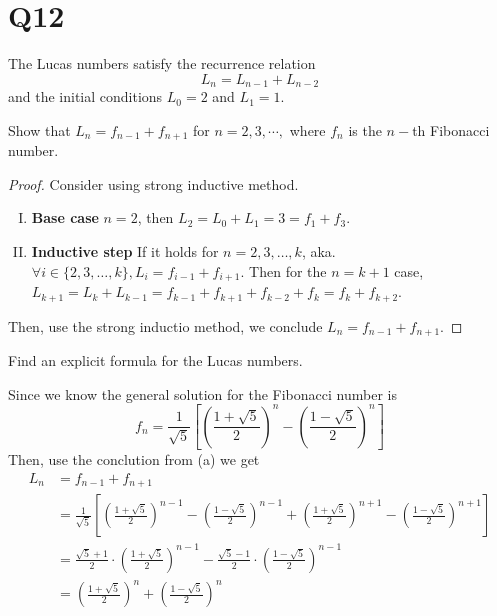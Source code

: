 \documentclass[11pt]{article}
\begin{document}
\section*{Q12}

The Lucas numbers satisfy the recurrence relation
\[L_n = L_{n-1} + L_{n-2}\]
and the initial conditions $L_0 = 2$ and $L_1 = 1.$
\begin{qparts}
\item Show that $L_n = f_{n-1} + f_{n+1}$ for $n = 2, 3, \cdots ,$
where $f_n$ is the $n-$th Fibonacci number.
\begin{proof}
    Consider using strong inductive method. 
    \begin{enumerate}[(I)]
        
        \item \textbf{Base case} $n=2$, then $L_2=L_0+L_1=3=f_1+f_3$.
        \item \textbf{Inductive step} If it holds for $n=2,3, \ldots ,k$, aka. $\forall i \in \{ 2,3, \ldots ,k \}, L_{i}=f_{i-1}+f_{i+1}$. Then for the $n=k+1$ case, $L_{k+1}=L_{k}+L_{k-1}=f_{k-1}+f_{k+1}+f_{k-2}+f_{k}=f_{k}+f_{k+2}$.
    \end{enumerate}
    Then, use the strong inductio method, we conclude $L_n = f_{n-1} + f_{n+1}$.
\end{proof}

\item Find an explicit formula for the Lucas numbers.
\begin{solution}
Since we know the general solution for the Fibonacci number is 
\begin{equation*}
  f_n=\frac{1}{\sqrt{5}}\left[ 
    \left( \frac{1+\sqrt{5}}{2} \right)^{n}-
    \left( \frac{1-\sqrt{5}}{2} \right)^{n}
   \right] 
\end{equation*}
Then, use the conclution from (a) we get 
\begin{align*}
    L_{n}&=f_{n-1} + f_{n+1}\\
        &=\frac{1}{\sqrt{5}}\left[ 
            \left( \frac{1+\sqrt{5}}{2} \right)^{n-1}-
            \left( \frac{1-\sqrt{5}}{2} \right)^{n-1}+
            \left( \frac{1+\sqrt{5}}{2} \right)^{n+1}-
            \left( \frac{1-\sqrt{5}}{2} \right)^{n+1}
           \right]\\
        &=\frac{\sqrt{5}+1}{2}\cdot \left( \frac{1+\sqrt{5}}{2} \right)^{n-1}-
        \frac{\sqrt{5}-1}{2}\cdot \left( \frac{1-\sqrt{5}}{2} \right)^{n-1}\\
        &=\left( \frac{1+\sqrt{5}}{2} \right)^{n}+
        \left( \frac{1-\sqrt{5}}{2} \right)^{n}
\end{align*}
\end{solution}
\end{qparts}
\end{document}
